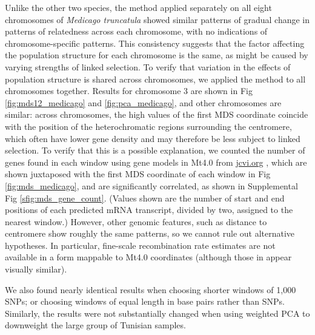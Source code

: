 \documentclass[11pt, oneside]{article}   	%
\newcommand\citet{\cite}
\newcommand\citep{\cite}
\newcommand{\Figure}{Fig }
\newcommand{\Figures}{Fig }
\newcommand{\Figure}{{Figure }}
\newcommand{\Figures}{{Figures }}
\begin{document}
Unlike the other two species,
the method applied separately on all eight chromosomes of \textit{Medicago truncatula} 
showed similar patterns of gradual change in patterns of relatedness across each chromosome,
with no indications of chromosome-specific patterns.
This consistency suggests that the factor affecting the population structure for each chromosome is the same,
as might be caused by varying strengths of linked selection.
To verify that variation in the effects of population structure is shared across chromosomes,
we applied the method to all chromosomes together.
Results for chromosome 3 are shown in \Figures \ref{fig:mds12_medicago} and \ref{fig:pca_medicago},
and other chromosomes are similar:
across chromosomes, the high values of the first MDS coordinate coincide with the position of the heterochromatic regions surrounding the centromere,
which often have lower gene density and may therefore be less subject to linked selection.
To verify that this is a possible explanation,
we counted the number of genes found in each window using gene models in Mt4.0 from \url{jcvi.org} \citep{tang2014improved},
which are shown juxtaposed with
the first MDS coordinate of each window in \Figure \ref{fig:mds_medicago},
and are significantly correlated, as shown in Supplemental \Figure \ref{sfig:mds_gene_count}.
(Values shown are the number of start and end positions of each predicted mRNA transcript,
divided by two, assigned to the nearest window.)
However, other genomic features, such as distance to centromere show roughly the same patterns,
so we cannot rule out alternative hypotheses.
In particular, fine-scale recombination rate estimates are not available in a form mappable
to Mt4.0 coordinates (although those in \citet{paape2012finescale} appear visually similar).

We also found nearly identical results when choosing shorter windows of 1,000 SNPs;
or choosing windows of equal length in base pairs rather than SNPs.
Similarly, the results were not substantially changed
when using weighted PCA to downweight the large group of Tunisian samples.
\end{document}
